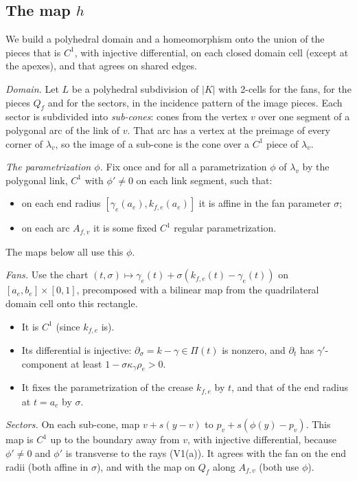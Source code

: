 \subsection{The map $h$}
We build a polyhedral domain and a homeomorphism onto the union of the pieces that is $C^1$, with injective
differential, on each closed domain cell (except at the apexes), and that agrees on shared edges.

\emph{Domain.} Let $L$ be a polyhedral subdivision of $|K|$ with 2-cells for the fans, for the pieces $Q_f$ and for the
sectors, in the incidence pattern of the image pieces. Each sector is subdivided into \emph{sub-cones}: cones from the
vertex $v$ over one segment of a polygonal arc of the link of $v$. That arc has a vertex at the preimage of every corner
of $\lambda_v$, so the image of a sub-cone is the cone over a $C^1$ piece of $\lambda_v$.

\emph{The parametrization $\phi$.} Fix once and for all a parametrization $\phi$ of $\lambda_v$ by the polygonal link,
$C^1$ with $\phi'\ne0$ on each link segment, such that:
\begin{itemize}
\item on each end radius $[\gamma_e(a_e),k_{f,e}(a_e)]$ it is affine in the fan parameter $\sigma$;
\item on each arc $A_{f,v}$ it is some fixed $C^1$ regular parametrization.
\end{itemize}
The maps below all use this $\phi$.

\emph{Fans.} Use the chart $(t,\sigma)\mapsto\gamma_e(t)+\sigma(k_{f,e}(t)-\gamma_e(t))$ on $[a_e,b_e]\times[0,1]$,
precomposed with a bilinear map from the quadrilateral domain cell onto this rectangle.
\begin{itemize}
\item It is $C^1$ (since $k_{f,e}$ is).
\item Its differential is injective: $\partial_\sigma=k-\gamma\in\Pi(t)$ is nonzero, and $\partial_t$ has
$\gamma'$-component at least $1-\sigma\kappa_\gamma\rho_e>0$.
\item It fixes the parametrization of the crease $k_{f,e}$ by $t$, and that of the end radius at $t=a_e$ by $\sigma$.
\end{itemize}

\emph{Sectors.} On each sub-cone, map $v+s(y-v)$ to $p_v+s(\phi(y)-p_v)$. This map is $C^1$ up to the boundary
away from $v$, with injective differential, because $\phi'\ne0$ and $\phi'$ is transverse to the rays (V1(a)). It agrees
with the fan on the end radii (both affine in $\sigma$), and with the map on $Q_f$ along $A_{f,v}$ (both use $\phi$).

